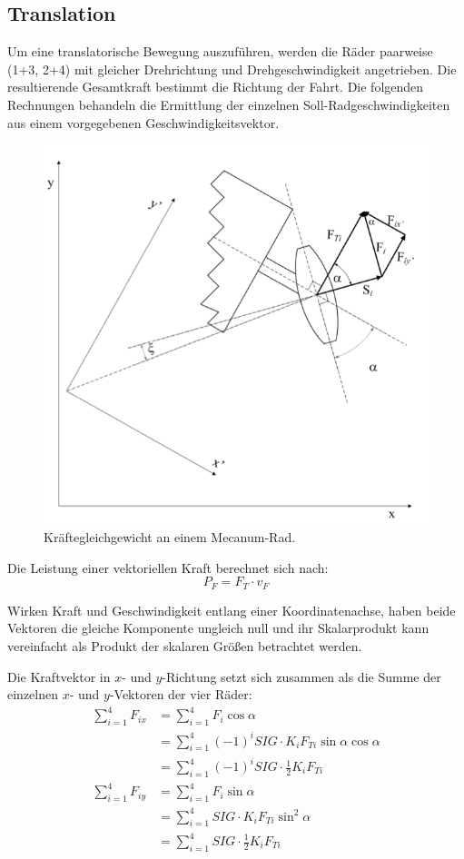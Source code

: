 \subsection{Translation}
\label{sec:Translation}
Um eine translatorische Bewegung auszuführen, werden die Räder paarweise (1+3, 2+4) mit gleicher Drehrichtung und Drehgeschwindigkeit angetrieben.
Die resultierende Gesamtkraft bestimmt die Richtung der Fahrt.
Die folgenden Rechnungen behandeln die Ermittlung der einzelnen Soll-Radgeschwindigkeiten aus einem vorgegebenen Geschwindigkeitsvektor.

\begin{figure}[H]
    \centering
    \includegraphics[width=.6\textwidth]{Abbildungen/Kraefte-am-Rad}
    \caption{Kräftegleichgewicht an einem Mecanum-Rad.}
\end{figure}

Die Leistung einer vektoriellen Kraft berechnet sich nach: 
$$ P_F = F_T \cdot v_F $$

Wirken Kraft und Geschwindigkeit entlang einer Koordinatenachse, haben beide Vektoren die gleiche Komponente ungleich null und ihr Skalarprodukt kann vereinfacht als Produkt der skalaren Größen betrachtet werden.

Die Kraftvektor in $x$- und $y$-Richtung setzt sich zusammen als die Summe der einzelnen $x$- und $y$-Vektoren der vier Räder:
\begin{align*}
    \sum_{i=1}^4 F_{ix} &= \sum_{i=1}^4 F_i \cos \alpha \\
    &= \sum_{i=1}^4 (-1)^i SIG \cdot K_i F_{Ti} \sin \alpha \cos \alpha \\
    &= \sum_{i=1}^4 (-1)^i SIG \cdot \frac{1}{2} K_i F_{Ti} \\
    \sum_{i=1}^4 F_{iy} &= \sum_{i=1}^4 F_i \sin \alpha \\
    &= \sum_{i=1}^4 SIG \cdot K_i F_{Ti} \sin^2 \alpha \\
    &= \sum_{i=1}^4 SIG \cdot \frac{1}{2} K_i F_{Ti}
\end{align*}

